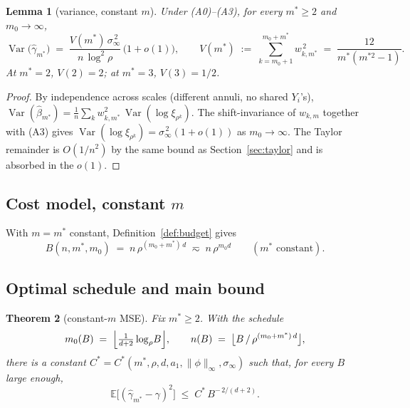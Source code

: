 \documentclass[11pt]{article}
\newcommand{\E}{\mathbb{E}}
\newcommand{\Var}{\operatorname{Var}}
\theoremstyle{plain}
\newtheorem{theorem}{Theorem}
\newtheorem{lemma}[theorem]{Lemma}
\theoremstyle{definition}
\begin{document}
\begin{lemma}[variance, constant $m$]\label{lem:var-const}
Under (A0)--(A3), for every $m^{\ast}\ge 2$ and $m_0 \to \infty$,
\begin{equation}\label{eq:var-const}
  \Var\!\bigl(\hat\gamma_{m^{\ast}}\bigr)
  \;=\;
  \frac{V(m^{\ast})\,\sigma_\infty^{\,2}}{n\,\log^{2}\!\rho}
  \,\bigl(1+o(1)\bigr),
  \qquad
  V(m^{\ast}) \;:=\; \sum_{k=m_0+1}^{m_0+m^{\ast}} w_{k,m^{\ast}}^{\,2}
                 \;=\; \frac{12}{m^{\ast}(m^{\ast 2}-1)}.
\end{equation}
At $m^{\ast}=2$, $V(2) = 2$; at $m^{\ast}=3$, $V(3) = 1/2$.
\end{lemma}

\begin{proof}
By independence across scales (different annuli, no shared $Y_i$'s),
\(
  \Var(\hat\beta_{m^{\ast}})
  = \tfrac{1}{n}\sum_{k} w_{k,m^{\ast}}^{2}\,\Var(\log\xi_{\rho^k}).
\)
The shift-invariance of $w_{k,m}$ together with (A3) gives
$\Var(\log\xi_{\rho^{k}}) = \sigma_\infty^{\,2}(1+o(1))$ as $m_0\to\infty$.
The Taylor remainder is $O(1/n^{2})$ by the same bound as
Section~\ref{sec:taylor} and is absorbed in the $o(1)$.
\end{proof}

\subsection*{Cost model, constant $m$}

With $m=m^{\ast}$ constant, Definition~\ref{def:budget} gives
\[
  B(n, m^{\ast}, m_0)
  \;=\; n\,\rho^{(m_0+m^{\ast})\,d}
  \;\eqsim\; n\,\rho^{m_0 d}
  \qquad(m^{\ast} \text{ constant}).
\]

\subsection*{Optimal schedule and main bound}

\begin{theorem}[constant-$m$ MSE]\label{thm:const-m}
Fix $m^{\ast}\ge 2$. With the schedule
\begin{equation}\label{eq:const-m-schedule}
  m_0(B) \;=\; \Bigl\lfloor \tfrac{1}{d+2}\log_\rho\!B \Bigr\rfloor,
  \qquad
  n(B) \;=\; \bigl\lfloor B \,/\, \rho^{(m_0+m^{\ast})\,d}\bigr\rfloor,
\end{equation}
there is a constant $C^{\ast} = C^{\ast}(m^{\ast}, \rho, d, a_1,
\|\phi\|_\infty, \sigma_\infty)$ such that, for every $B$ large
enough,
\begin{equation}\label{eq:const-m-main}
  \E\bigl[(\hat\gamma_{m^{\ast}} - \gamma)^{2}\bigr]
  \;\le\; C^{\ast}\,B^{-\,2/(d+2)}.
\end{equation}
\end{theorem}
\end{document}
